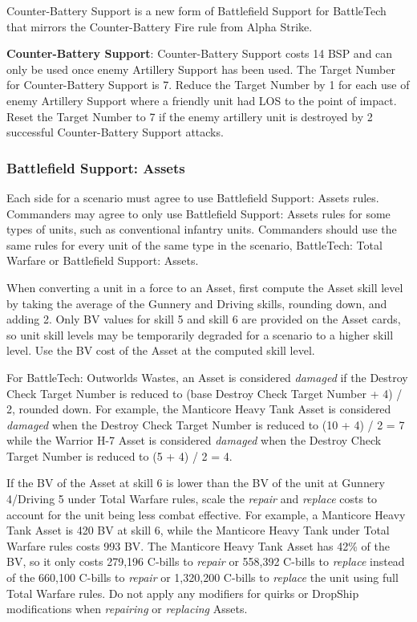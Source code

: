 Counter-Battery Support is a new form of Battlefield Support for BattleTech that mirrors the Counter-Battery Fire rule from Alpha Strike.

{\bfseries Counter-Battery Support}:
Counter-Battery Support costs 14 BSP and can only be used once enemy Artillery Support has been used.
The Target Number for Counter-Battery Support is 7.
Reduce the Target Number by 1 for each use of enemy Artillery Support where a friendly unit had LOS to the point of impact.
Reset the Target Number to 7 if the enemy artillery unit is destroyed by 2 successful Counter-Battery Support attacks.

\subsubsection{Battlefield Support: Assets}

Each side for a scenario must agree to use Battlefield Support: Assets rules.
Commanders may agree to only use Battlefield Support: Assets rules for some types of units, such as conventional infantry units.
Commanders should use the same rules for every unit of the same type in the scenario, BattleTech: Total Warfare or Battlefield Support: Assets.

When converting a unit in a force to an Asset, first compute the Asset skill level by taking the average of the Gunnery and Driving skills, rounding down, and adding 2.
Only BV values for skill 5 and skill 6 are provided on the Asset cards, so unit skill levels may be temporarily degraded for a scenario to a higher skill level.
Use the BV cost of the Asset at the computed skill level.

For BattleTech: Outworlds Wastes, an Asset is considered \emph{damaged} if the Destroy Check Target Number is reduced to (base Destroy Check Target Number + 4) / 2, rounded down.
For example, the Manticore Heavy Tank Asset is considered \emph{damaged} when the Destroy Check Target Number is reduced to (10 + 4) / 2 = 7 while the Warrior H-7 Asset is considered \emph{damaged} when the Destroy Check Target Number is reduced to (5 + 4) / 2 = 4.

If the BV of the Asset at skill 6 is lower than the BV of the unit at Gunnery 4/Driving 5 under Total Warfare rules, scale the \emph{repair} and \emph{replace} costs to account for the unit being less combat effective.
For example, a Manticore Heavy Tank Asset is 420 BV at skill 6, while the Manticore Heavy Tank under Total Warfare rules costs 993 BV.
The Manticore Heavy Tank Asset has 42\% of the BV, so it only costs 279,196 C-bills to \emph{repair} or 558,392 C-bills to \emph{replace} instead of the 660,100 C-bills to \emph{repair} or 1,320,200 C-bills to \emph{replace} the unit using full Total Warfare rules.
Do not apply any modifiers for quirks or DropShip modifications when \emph{repairing} or \emph{replacing} Assets.
